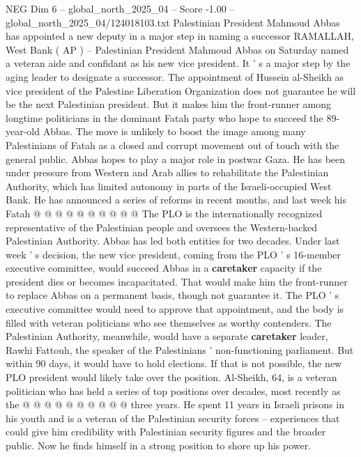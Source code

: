 \begin{textsample}{NEG Dim 6 – global\_north\_2025\_04 – Score -1.00 – global\_north\_2025\_04/124018103.txt}  \label{ex:f6_neg_257}
Palestinian President Mahmoud Abbas has appointed a new deputy in a major step in naming a successor RAMALLAH, West Bank ( AP ) -- Palestinian President Mahmoud Abbas on Saturday named a veteran aide and confidant as his new vice president.
It ' s a major step by the aging leader to designate a successor.
The appointment of Hussein al-Sheikh as vice president of the Palestine Liberation Organization does not guarantee he will be the next Palestinian president.
But it makes him the front-runner among longtime politicians in the dominant Fatah party who hope to succeed the 89-year-old Abbas.
The move is unlikely to boost the image among many Palestinians of Fatah as a closed and corrupt movement out of touch with the general public.
Abbas hopes to play a major role in postwar Gaza.
He has been under pressure from Western and Arab allies to rehabilitate the Palestinian Authority, which has limited autonomy in parts of the Israeli-occupied West Bank.
He has announced a series of reforms in recent months, and last week his Fatah @ @ @ @ @ @ @ @ @ @ The PLO is the internationally recognized representative of the Palestinian people and oversees the Western-backed Palestinian Authority.
Abbas has led both entities for two decades.
Under last week ' s decision, the new vice president, coming from the PLO ' s 16-member executive committee, would succeed Abbas in a \textbf{caretaker} capacity if the president dies or becomes incapacitated.
That would make him the front-runner to replace Abbas on a permanent basis, though not guarantee it.
The PLO ' s executive committee would need to approve that appointment, and the body is filled with veteran politicians who see themselves as worthy contenders.
The Palestinian Authority, meanwhile, would have a separate \textbf{caretaker} leader, Rawhi Fattouh, the speaker of the Palestinians ' non-functioning parliament.
But within 90 days, it would have to hold elections.
If that is not possible, the new PLO president would likely take over the position.
Al-Sheikh, 64, is a veteran politician who has held a series of top positions over decades, most recently as the @ @ @ @ @ @ @ @ @ @ three years.
He spent 11 years in Israeli prisons in his youth and is a veteran of the Palestinian security forces -- experiences that could give him credibility with Palestinian security figures and the broader public.
Now he finds himself in a strong position to shore up his power.

\end{textsample}
